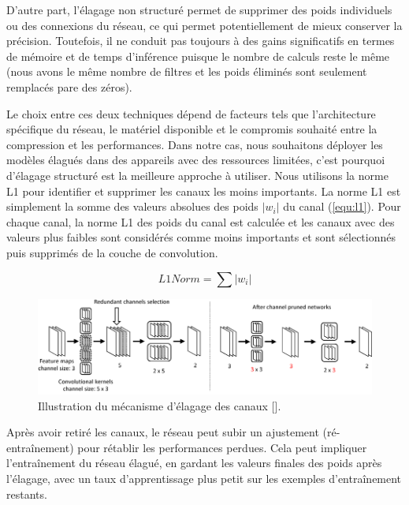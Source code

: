 D'autre part, l'élagage non structuré permet de supprimer des poids individuels ou des connexions du réseau, ce qui permet potentiellement de mieux conserver la précision. Toutefois, il ne conduit pas toujours à des gains significatifs en termes de mémoire et de temps d'inférence puisque le nombre de calculs reste le même (nous avons le même nombre de filtres et les poids éliminés sont seulement remplacés pare des zéros).

Le choix entre ces deux techniques dépend de facteurs tels que l'architecture spécifique du réseau, le matériel disponible et le compromis souhaité entre la compression et les performances. Dans notre cas, nous souhaitons déployer les modèles élagués dans des appareils avec des ressources limitées, c'est pourquoi d'élagage structuré est la meilleure approche à utiliser. Nous utilisons la norme L1 pour identifier et supprimer les canaux les moins importants. La norme L1 est simplement la somme des valeurs absolues des poids $|w_i|$ du canal (\ref{equ:l1}). Pour chaque canal, la norme L1 des poids du canal est calculée et les canaux avec des valeurs plus faibles sont considérés comme moins importants et sont sélectionnés puis supprimés de la couche de convolution.

\begin{equation}
    L1 Norm = \sum |w_i|
    \label{equ:l1}
\end{equation}

\begin{figure}[hbt!]
  \centering
  \includegraphics[width=15cm]{images_pfe/channel-pruning.png}
  \caption{Illustration du mécanisme d’élagage des canaux [\cite{Yamamoto2018PCASPC}].}
  \label{fig:mnist}
\end{figure}
\FloatBarrier
\medskip

Après avoir retiré les canaux, le réseau peut subir un ajustement (ré-entraînement) pour rétablir les performances perdues. Cela peut impliquer l'entraînement du réseau élagué, en gardant les valeurs finales des poids après l'élagage, avec un taux d'apprentissage plus petit sur les exemples d'entraînement restants.


